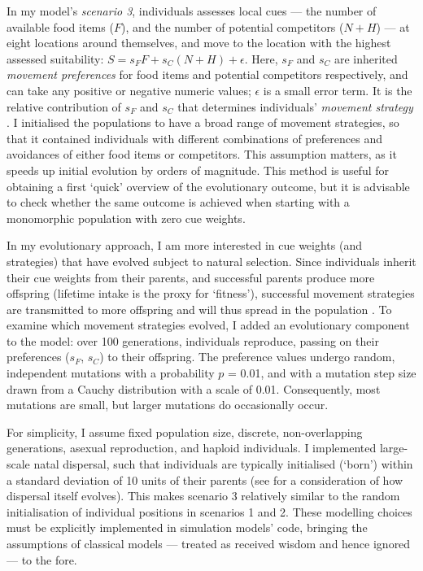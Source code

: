 \begin{interludeenv}
In my model's \textit{scenario 3}, individuals assesses local cues --- the number of available food items ($F$), and the number of potential competitors ($N + H$) --- at eight locations around themselves, and move to the location with the highest assessed suitability: $S = s_FF + s_C(N + H) + \epsilon$.
Here, $s_F$ and $s_C$ are inherited \textit{movement preferences} for food items and potential competitors respectively, and can take any positive or negative numeric values; $\epsilon$ is a small error term.
It is the relative contribution of $s_F$ and $s_C$ that determines individuals' \textit{movement strategy} \parencite[similar to the behavioural hypervolume of][]{bastille-rousseau2019}.
I initialised the populations to have a broad range of movement strategies, so that it contained individuals with different combinations of preferences and avoidances of either food items or competitors.
This assumption matters, as it speeds up initial evolution by orders of magnitude. 
This method is useful for obtaining a first `quick' overview of the evolutionary outcome, but it is advisable to check whether the same outcome is achieved when starting with a monomorphic population with zero cue weights.

In my evolutionary approach, I am more interested in cue weights (and strategies) that have evolved subject to natural selection.
Since individuals inherit their cue weights from their parents, and successful parents produce more offspring (lifetime intake is the proxy for `fitness'), successful movement strategies are transmitted to more offspring and will thus spread in the population \parencite[an expectation from the replicator equation:][]{hofbauer1988}.
To examine which movement strategies evolved, I added an evolutionary component to the model: over 100 generations, individuals reproduce, passing on their preferences ($s_F$, $s_C$) to their offspring.
The preference values undergo random, independent mutations with a probability $p$ = 0.01, and with a mutation step size drawn from a Cauchy distribution with a scale of 0.01.
Consequently, most mutations are small, but larger mutations do occasionally occur.

For simplicity, I assume fixed population size, discrete, non-overlapping generations, asexual reproduction, and haploid individuals.
I implemented large-scale natal dispersal, such that individuals are typically initialised (`born') within a standard deviation of 10 units of their parents (see \cite{travis1999} for a consideration of how dispersal itself evolves).
This makes scenario 3 relatively similar to the random initialisation of individual positions in scenarios 1 and 2.
These modelling choices must be explicitly implemented in simulation models' code, bringing the assumptions of classical models --- treated as received wisdom and hence ignored --- to the fore.


\end{interludeenv}
